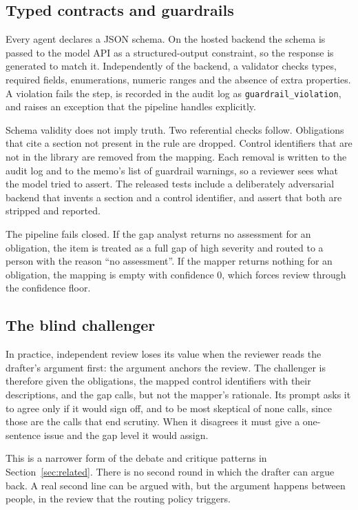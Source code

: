 \documentclass[sigconf,review,anonymous]{acmart}
\newcommand{\gapnone}{\textsf{none}}
\newcommand{\gapfull}{\textsf{full}}
\begin{document}
\subsection{Typed contracts and guardrails}
\label{sec:guardrails}

Every agent declares a JSON schema. On the hosted backend the schema is
passed to the model API as a structured-output constraint, so the response is
generated to match it. Independently of the backend, a validator checks
types, required fields, enumerations, numeric ranges and the absence of
extra properties. A violation fails the step, is recorded in the audit log
as \texttt{guardrail\_violation}, and raises an exception that the pipeline
handles explicitly.

Schema validity does not imply truth. Two referential checks follow.
Obligations that cite a section not present in the rule are dropped.
Control identifiers that are not in the library are removed from the
mapping. Each removal is written to the audit log and to the memo's list of
guardrail warnings, so a reviewer sees what the model tried to assert. The
released tests include a deliberately adversarial backend that invents a
section and a control identifier, and assert that both are stripped and
reported.

The pipeline fails closed. If the gap analyst returns no assessment for an
obligation, the item is treated as a \gapfull{} gap of high severity and
routed to a person with the reason ``no assessment''. If the mapper returns
nothing for an obligation, the mapping is empty with confidence 0, which
forces review through the confidence floor.

\subsection{The blind challenger}
\label{sec:challenger}

In practice, independent review loses its value when the reviewer reads the
drafter's argument first: the argument anchors the review. The challenger is
therefore given the obligations, the mapped control identifiers with their
descriptions, and the gap calls, but not the mapper's rationale. Its prompt
asks it to agree only if it would sign off, and to be most skeptical of
\gapnone{} calls, since those are the calls that end scrutiny. When it
disagrees it must give a one-sentence issue and the gap level it would
assign.

This is a narrower form of the debate and critique patterns in
Section~\ref{sec:related}. There is no second round in which the drafter can
argue back. A real second line can be argued with, but the argument happens
between people, in the review that the routing policy triggers.
\end{document}
